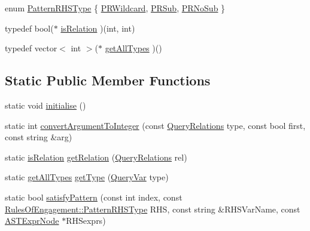 \begin{DoxyCompactItemize}
enum \hyperlink{class_rules_of_engagement_a97613ded2253a252de010070d7c54ac1}{Pattern\-R\-H\-S\-Type} \{ \hyperlink{class_rules_of_engagement_a97613ded2253a252de010070d7c54ac1ab823799dfda20af778a3848abfc46e84}{P\-R\-Wildcard}, 
\hyperlink{class_rules_of_engagement_a97613ded2253a252de010070d7c54ac1a956642bd04a30d5d37ea95257f79d331}{P\-R\-Sub}, 
\hyperlink{class_rules_of_engagement_a97613ded2253a252de010070d7c54ac1a106d4eaf9b0bc4cefdee0e20e244e06a}{P\-R\-No\-Sub}
 \}
\item 
typedef bool($\ast$ \hyperlink{class_rules_of_engagement_aad838c0ef69d7c4ee9bef23a431ff6c1}{is\-Relation} )(int, int)
\item 
typedef vector$<$ int $>$($\ast$ \hyperlink{class_rules_of_engagement_a1a051f48865a7a4d7f07f0a89f16aafe}{get\-All\-Types} )()
\end{DoxyCompactItemize}
\subsection*{Static Public Member Functions}
\begin{DoxyCompactItemize}
\item 
static void \hyperlink{class_rules_of_engagement_a4ffc088479ffe671fdcc3ff658faa973}{initialise} ()
\item 
static int \hyperlink{class_rules_of_engagement_a82a4e55b543189f43f270cb32b7f9e49}{convert\-Argument\-To\-Integer} (const \hyperlink{class_rules_of_engagement_a5e08db2a0638b98dbb06ad923a33d817}{Query\-Relations} type, const bool first, const string \&arg)
\item 
static \hyperlink{class_rules_of_engagement_aad838c0ef69d7c4ee9bef23a431ff6c1}{is\-Relation} \hyperlink{class_rules_of_engagement_a18a80f1ce5bcf4c10fa520a0785c0922}{get\-Relation} (\hyperlink{class_rules_of_engagement_a5e08db2a0638b98dbb06ad923a33d817}{Query\-Relations} rel)
\item 
static \hyperlink{class_rules_of_engagement_a1a051f48865a7a4d7f07f0a89f16aafe}{get\-All\-Types} \hyperlink{class_rules_of_engagement_a2b4845903e7378ebf4955714da0d36bf}{get\-Type} (\hyperlink{class_rules_of_engagement_a5dd2b28fd0c906d9b08e29e371713ead}{Query\-Var} type)
\item 
static bool \hyperlink{class_rules_of_engagement_a6d82299f9e291ea53856f9eeff143451}{satisfy\-Pattern} (const int index, const \hyperlink{class_rules_of_engagement_a97613ded2253a252de010070d7c54ac1}{Rules\-Of\-Engagement\-::\-Pattern\-R\-H\-S\-Type} R\-H\-S, const string \&R\-H\-S\-Var\-Name, const \hyperlink{class_a_s_t_expr_node}{A\-S\-T\-Expr\-Node} $\ast$R\-H\-Sexprs)
\end{DoxyCompactItemize}
